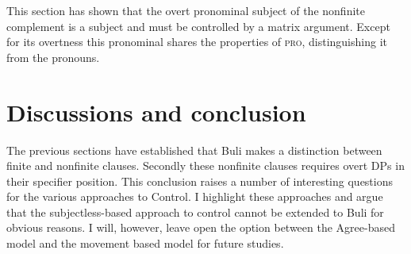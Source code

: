 \documentclass[output=paper,colorlinks,citecolor=brown]{langscibook}
\begin{document}
This section has shown that the overt pronominal subject of the nonfinite complement is a subject and must be controlled by a matrix argument. Except for its overtness  this pronominal shares the properties of \textsc{pro}, distinguishing it from the pronouns. 
%

\section{Discussions and conclusion}\label{sec:sulemana:6}

The previous sections have established that Buli makes a distinction between finite and nonfinite clauses. Secondly these nonfinite clauses requires overt DPs in their specifier position. This conclusion raises a number of interesting questions for the various approaches to Control. I highlight these approaches and argue that the subjectless-based approach to  control cannot be extended to Buli for obvious reasons. I will, however, leave open the option between the Agree-based model and the movement based model for future studies. 
\end{document}
